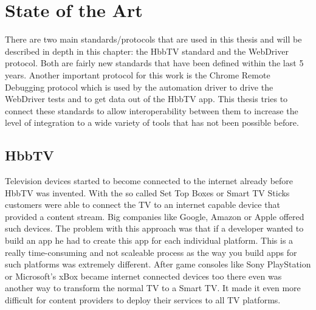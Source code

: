 %
%

\chapter{State of the Art\label{cha:state_of_the_art}}

There are two main standards/protocols that are used in this thesis and will be described in depth in this chapter: the HbbTV standard and the WebDriver protocol. Both are fairly new standards that have been defined within the last 5 years. Another important protocol for this work is the Chrome Remote Debugging protocol which is used by the automation driver to drive the WebDriver tests and to get data out of the HbbTV app. This thesis tries to connect these standards to allow interoperability between them to increase the level of integration to a wide variety of tools that has not been possible before.

\section{HbbTV\label{sec:hbbtv}}


Television devices started to become connected to the internet already before HbbTV was invented. With the so called Set Top Boxes or Smart TV Sticks customers were able to connect the TV to an internet capable device that provided a content stream. Big companies like Google, Amazon or Apple offered such devices. The problem with this approach was that if a developer wanted to build an app he had to create this app for each individual platform. This is a really time-consuming and not scaleable process as the way you build apps for such platforms was extremely different. After game consoles like Sony PlayStation or Microsoft's xBox became internet connected devices too there even was another way to transform the normal TV to a Smart TV. It made it even more difficult for content providers to deploy their services to all TV platforms.

